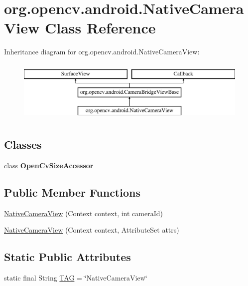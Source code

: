 \hypertarget{classorg_1_1opencv_1_1android_1_1_native_camera_view}{}\section{org.\+opencv.\+android.\+Native\+Camera\+View Class Reference}
\label{classorg_1_1opencv_1_1android_1_1_native_camera_view}
Inheritance diagram for org.\+opencv.\+android.\+Native\+Camera\+View\+:\begin{figure}[H]
\begin{center}
\leavevmode
\includegraphics[height=3.000000cm]{classorg_1_1opencv_1_1android_1_1_native_camera_view}
\end{center}
\end{figure}
\subsection*{Classes}
\begin{DoxyCompactItemize}
\item 
class {\bfseries Open\+Cv\+Size\+Accessor}
\end{DoxyCompactItemize}
\subsection*{Public Member Functions}
\begin{DoxyCompactItemize}
\item 
\mbox{\hyperlink{classorg_1_1opencv_1_1android_1_1_native_camera_view_a5443d2ef3ae99f3e45843da42f4a7548}{Native\+Camera\+View}} (Context context, int camera\+Id)
\item 
\mbox{\hyperlink{classorg_1_1opencv_1_1android_1_1_native_camera_view_afe565ded8527994cacc31fbb624b9971}{Native\+Camera\+View}} (Context context, Attribute\+Set attrs)
\end{DoxyCompactItemize}
\subsection*{Static Public Attributes}
\begin{DoxyCompactItemize}
\item 
static final String \mbox{\hyperlink{classorg_1_1opencv_1_1android_1_1_native_camera_view_a404b4651270913f2ae1d80a340430d4a}{T\+AG}} = \char`\"{}Native\+Camera\+View\char`\"{}
\end{DoxyCompactItemize}
